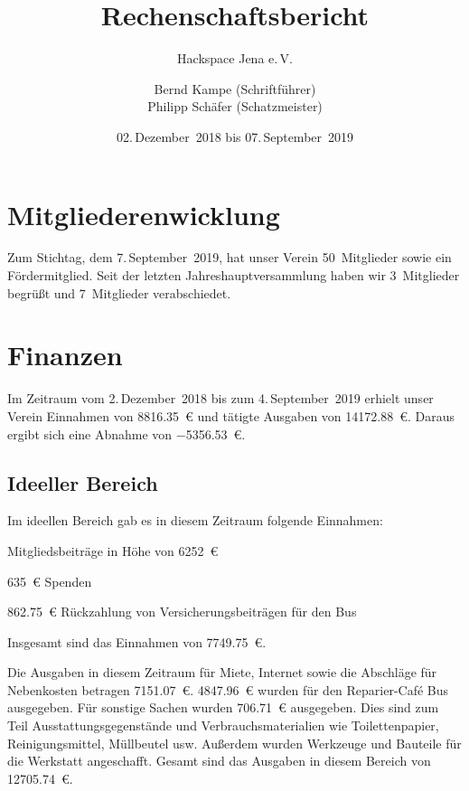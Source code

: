\documentclass[ngerman]{scrartcl}
\title{Rechenschaftsbericht}
\subtitle{Hackspace Jena e.\,V.}
\author{%
	Bernd Kampe (Schriftführer)\\
	Philipp Schäfer (Schatzmeister)
}
\date{02.\,Dezember~2018 bis 07.\,September~2019}
\begin{document}
\maketitle{}
\newpage

\tableofcontents{}

\newpage{}

\section{Mitgliederenwicklung}

Zum Stichtag, dem 7.\,September~2019, hat unser Verein 50~Mitglieder sowie ein Fördermitglied.
Seit der letzten Jahreshauptversammlung haben wir 3~Mitglieder begrüßt und 7~Mitglieder verabschiedet.

\section{Finanzen}

Im Zeitraum vom 2.\,Dezember~2018 bis zum 4.\,September~2019 erhielt unser Verein Einnahmen von \num{8816.35}~\euro{} und tätigte Ausgaben von \num{14172,88}~\euro{}.
Daraus ergibt sich eine Abnahme von \num{-5356,53}~\euro{}.


\subsection{Ideeller Bereich}
\label{sec:ideeller_bereich}

Im ideellen Bereich gab es in diesem Zeitraum folgende Einnahmen:
\begin{compactitem}
\item Mitgliedsbeiträge in Höhe von \num{6252}~\euro{}
\item \num{635}~\euro{} Spenden
\item \num{862,75}~\euro{} Rückzahlung von Versicherungsbeiträgen für den Bus
\end{compactitem}
Insgesamt sind das Einnahmen von \num{7749,75}~\euro{}.

Die Ausgaben in diesem Zeitraum für Miete, Internet sowie die Abschläge für Nebenkosten betragen \num{7151,07}~\euro{}.
\num{4847,96}~\euro{} wurden für den Reparier-Café Bus ausgegeben.
Für sonstige Sachen wurden \num{706,71}~\euro{} ausgegeben.
Dies sind zum Teil Ausstattungsgegenstände und Verbrauchsmaterialien wie Toilettenpapier, Reinigungsmittel, Müllbeutel usw.
Außerdem wurden Werkzeuge und Bauteile für die Werkstatt angeschafft.
Gesamt sind das Ausgaben in diesem Bereich von \num{12705.74}~\euro{}.
\end{document}

